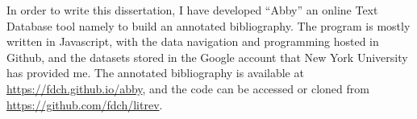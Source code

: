 In order to write this dissertation, I have developed ``Abby'' an online Text Database tool namely to build an annotated bibliography. The program is mostly written in Javascript, with the data navigation and programming hosted in Github, and the datasets stored in the Google account that New York University has provided me. The annotated bibliography is available at \url{https://fdch.github.io/abby}, and the code can be accessed or cloned from \url{https://github.com/fdch/litrev}.


